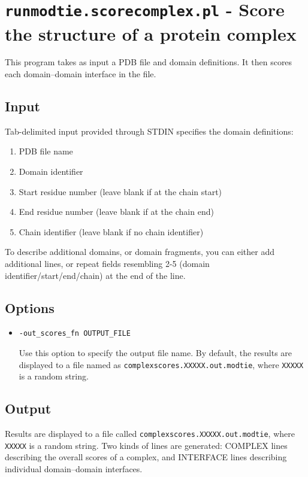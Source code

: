 \documentclass[11pt]{article}
\begin{document}
\section{{\tt runmodtie.scorecomplex.pl} - Score the structure of a protein complex}

This program takes as input a PDB file and domain definitions. It then scores each domain--domain interface in the file.

\subsection{Input}
Tab-delimited input provided through STDIN specifies the domain definitions:
\begin{enumerate}
   \item PDB file name
   \item Domain identifier
   \item Start residue number (leave blank if at the chain start)
   \item End residue number (leave blank if at the chain end)
   \item Chain identifier (leave blank if no chain identifier)
\end{enumerate}

To describe additional domains, or domain fragments, you can either add additional lines, or repeat fields resembling 2-5 (domain identifier/start/end/chain) at the end of the line.


\subsection{Options}
\begin{itemize}
   \item {\tt -out\_scores\_fn OUTPUT\_FILE}

Use this option to specify the output file name. By default, the results are displayed to a file named as {\tt complexscores.XXXXX.out.modtie}, where {\tt XXXXX} is a random string.

\end{itemize}

\subsection{Output}

Results are displayed to a file called {\tt complexscores.XXXXX.out.modtie}, where {\tt XXXXX} is a random string. Two kinds of lines are generated: COMPLEX lines describing the overall scores of a complex, and INTERFACE lines describing individual domain--domain interfaces.\\
\end{document}
